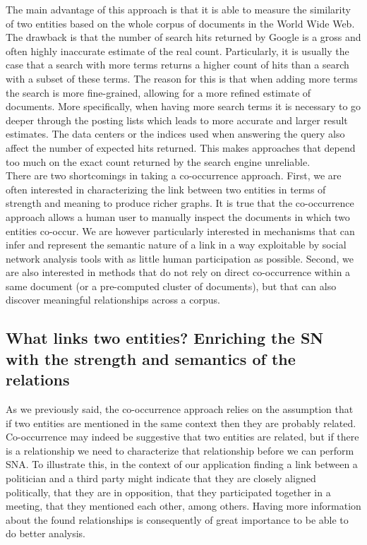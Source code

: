 The main advantage of this approach is that it is able to measure the similarity of two entities based on the whole corpus of documents in the World Wide Web. The drawback is that the number of search hits returned by Google is a gross and often highly inaccurate estimate of the real count. Particularly, it is usually the case that a search with more terms returns a higher count of hits than a search with a subset of these terms. The reason for this is that when adding more terms the search is more fine-grained, allowing for a more refined estimate of documents. More specifically, when having more search terms it is necessary to go deeper through the posting lists which leads to more accurate and larger result estimates. The data centers or the indices used when answering the query also affect the number of expected hits returned. This makes approaches that depend too much on the exact count returned by the search engine unreliable. \\

There are two shortcomings in taking a co-occurrence approach. First, we are often interested in characterizing the link between two entities in terms of strength and meaning to produce richer graphs. It is true that the co-occurrence approach allows a human user to manually inspect the documents in which two entities co-occur. We are however particularly interested in mechanisms that can infer and represent the semantic nature of a link in a way exploitable by social network analysis tools with as little human participation as possible. Second, we are also interested in methods that do not rely on direct co-occurrence within a same document (or a pre-computed cluster of documents), but that can also discover meaningful relationships across a corpus.\\

\subsection{What links two entities? Enriching the SN with the strength and semantics of the relations}\label{link-characterization}

As we previously said, the co-occurrence approach relies on the assumption that if two entities are mentioned in the same context then they are probably related. Co-occurrence may indeed be suggestive that two entities are related, but if there is a relationship we need to characterize that relationship before we can perform SNA. To illustrate this, in the context of our application finding a link between a politician and a third party might indicate that they are closely aligned politically, that they are in opposition, that they participated together in a meeting, that they mentioned each other, among others. Having more information about the found relationships is consequently of great importance to be able to do better analysis.  \\


